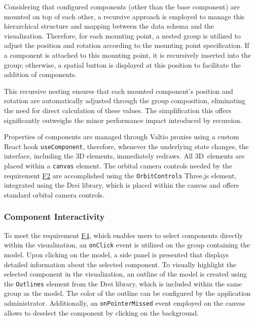 Considering that configured components (other than the base component) are mounted on top of each other, a recursive approach is employed to manage this hierarchical structure and mapping between the data schema and the visualization. Therefore, for each mounting point, a nested group is utilized to adjust the position and rotation according to the mounting point specification. If a component is attached to this mounting point, it is recursively inserted into the group; otherwise, a spatial button is displayed at this position to facilitate the addition of components. 

This recursive nesting ensures that each mounted component's position and rotation are automatically adjusted through the group composition, eliminating the need for direct calculation of these values. The simplification this offers significantly outweighs the minor performance impact introduced by recursion.

Properties of components are managed through Valtio proxies using a custom React hook \texttt{useComponent}, therefore, whenever the underlying state changes, the interface, including the 3D elements, immediately redraws.
All 3D~elements are placed within a  \texttt{canvas} element. The orbital camera controls needed by the requirement \hyperref[itm:F2]{F2} are accomplished using the \texttt{OrbitControls} Three.js element, integrated using the Drei library, which is placed within the canvas and offers standard orbital camera controls.


\subsubsection{Component Interactivity}

To meet the requirement \hyperref[itm:F4]{F4}, which enables users to select components directly within the visualization, an \texttt{onClick} event is utilized on the group containing the model. Upon clicking on the model, a side panel is presented that displays detailed information about the selected component. To visually highlight the selected component in the visualization, an outline of the model is created using the \texttt{Outlines} element from the Drei library, which is included within the same group as the model. The color of the outline can be configured by the application administrator. Additionally, an \texttt{onPointerMissed} event employed on the canvas allows to deselect the component by clicking on the background.


